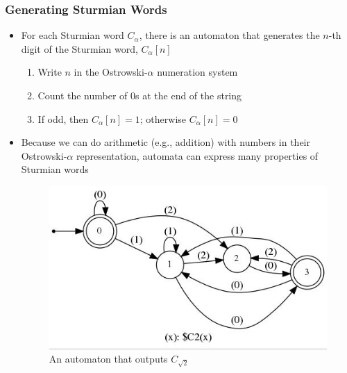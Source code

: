 \documentclass[leqno,presentation]{beamer}
\begin{document}
\begin{frame}
    \frametitle{Generating Sturmian Words}
    \begin{itemize}
        \item For each Sturmian word $C_{\alpha}$, there is an automaton that generates the $n$-th digit of the Sturmian word, $C_{\alpha}[n]$
            \begin{enumerate}
                \item Write $n$ in the Ostrowski-$\alpha$ numeration system
                \item Count the number of $0$s at the end of the string
                \item If odd, then $C_{\alpha}[n] = 1$; otherwise $C_{\alpha}[n] = 0$
            \end{enumerate}
            
        \item Because we can do arithmetic (e.g., addition) with numbers in their Ostrowski-$\alpha$ representation, automata can express many properties of Sturmian words
    
        \begin{figure}
            \centering
            \includegraphics[height=0.5\textheight]{images/c2.jpg}
            \caption{An automaton that outputs $C_{\sqrt{2}}$}
            \label{fig:c2}
        \end{figure}
    \end{itemize}
\end{frame}

    
\end{document}
